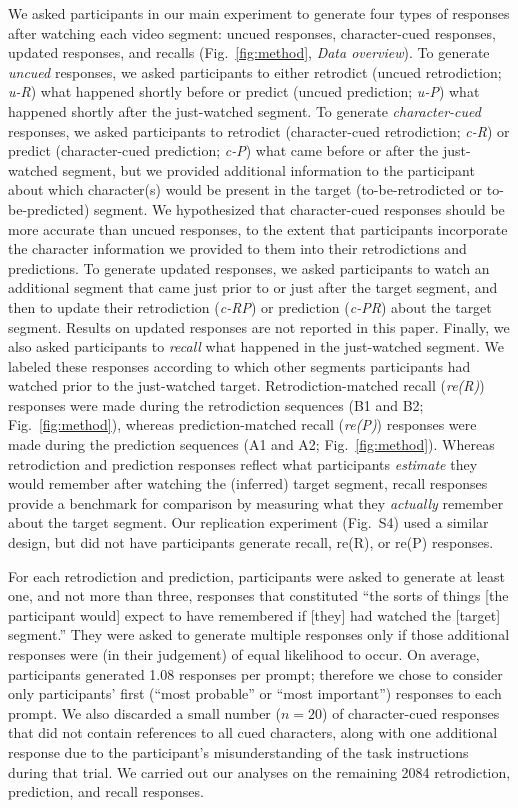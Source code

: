 \documentclass[10pt]{article}
\newcommand{\MethodsReplExp}{S4}
\begin{document}
We asked participants in our main experiment to generate four types of responses after watching each video segment: uncued responses, character-cued responses, updated responses, and recalls (Fig.~\ref{fig:method}, \textit{Data overview}).  To generate \textit{uncued} responses, we asked participants to either retrodict (uncued retrodiction; \textit{u-R}) what happened shortly before or predict (uncued prediction; \textit{u-P}) what happened shortly after the just-watched segment.  To generate \textit{character-cued} responses, we asked participants to retrodict (character-cued retrodiction; \textit{c-R}) or predict (character-cued prediction; \textit{c-P}) what came before or after the just-watched segment, but we provided additional information to the participant about which character(s) would be present in the target (to-be-retrodicted or to-be-predicted) segment.  We hypothesized that character-cued responses should be more accurate than uncued responses, to the extent that participants incorporate the character information we provided to them into their retrodictions and predictions.  To generate updated responses, we asked participants to watch an additional segment that came just prior to or just after the target segment, and then to update their retrodiction (\textit{c-RP}) or prediction (\textit{c-PR}) about the target segment. Results on updated responses are not reported in this paper. Finally, we also asked participants to \textit{recall} what happened in the just-watched segment.  We labeled these responses according to which other segments participants had watched prior to the just-watched target.  Retrodiction-matched recall (\textit{re(R)}) responses were made during the retrodiction sequences (B1 and B2; Fig.~\ref{fig:method}), whereas prediction-matched recall (\textit{re(P)}) responses were made during the prediction sequences (A1 and A2; Fig.~\ref{fig:method}).  Whereas retrodiction and prediction responses reflect what participants \textit{estimate} they would remember after watching the (inferred) target segment, recall responses provide a benchmark for comparison by measuring what they \textit{actually} remember about the target segment.  Our replication experiment (Fig.~\MethodsReplExp) used a similar design, but did not have participants generate recall, re(R), or re(P) responses.

For each retrodiction and prediction, participants were asked to generate at least one, and not more than three, responses that constituted ``the sorts of things [the participant would] expect to have remembered if [they] had watched the [target] segment.''  They were asked to generate multiple responses only if those additional responses were (in their judgement) of equal likelihood to occur.  On average, participants generated 1.08 responses per prompt; therefore we chose to consider only participants' first (``most probable'' or ``most important'') responses to each prompt.  We also discarded a small number ($n = 20$) of character-cued responses that did not contain references to all cued characters, along with one additional response due to the participant's misunderstanding of the task instructions during that trial.  We carried out our analyses on the remaining 2084 retrodiction, prediction, and recall responses.
\end{document}
